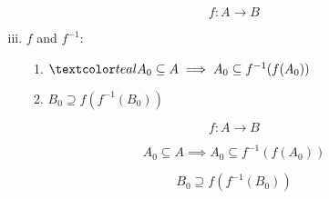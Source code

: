 \begin{frame}{}
  \begin{theorem}
    \[
      f: A \to B
    \]

    \vspace{-0.10cm}
    \begin{enumerate}[(i)]
      \setcounter{enumi}{2}
      \item $f$ and $f^{-1}$: \\[8pt]
	\begin{enumerate}[(1)]
	  \setlength{\itemsep}{10pt}
	  \setcounter{enumii}{8}
	    \item $\teal{A_0 \subseteq A} \implies A_0 \subseteq f^{-1}(f(A_0))$
	    \item $B_0 \supseteq f(f^{-1}(B_0))$
	\end{enumerate}
    \end{enumerate}
  \end{theorem}
\end{frame}

\begin{frame}{}
  \[
    f: A \to B
  \]

  \begin{theorem}[UD Problem 17.8]
    \[
      A_0 \subseteq A \implies A_0 \subseteq f^{-1}(f(A_0))
    \]
  \end{theorem}

  \pause
  \vspace{0.30cm}
  \begin{theorem}[]
    \[
      B_0 \supseteq f(f^{-1}(B_0))
    \]
  \end{theorem}

  \pause
  \vspace{0.30cm}
  \begin{center}
     \pause \\[10pt]

     \pause \\[5pt]
  \end{center}
\end{frame}
